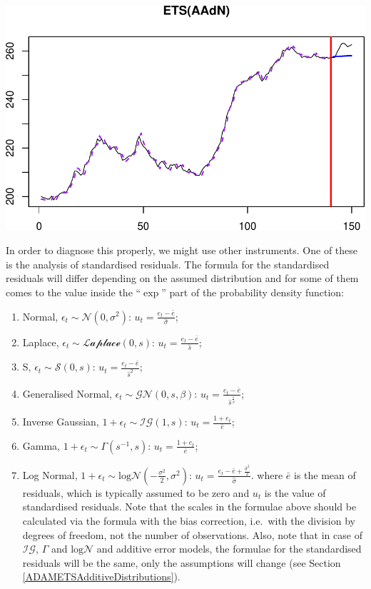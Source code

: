 \documentclass[
]{book}
\providecommand{\tightlist}{%
  \setlength{\itemsep}{0pt}\setlength{\parskip}{0pt}}
\theoremstyle{definition}
\theoremstyle{definition}
\theoremstyle{definition}
\theoremstyle{definition}
\theoremstyle{remark}
\begin{document}
\includegraphics{adam_files/figure-latex/unnamed-chunk-137-1.pdf}

In order to diagnose this properly, we might use other instruments. One of these is the analysis of standardised residuals. The formula for the standardised residuals will differ depending on the assumed distribution and for some of them comes to the value inside the ``\(\exp\)'' part of the probability density function:

\begin{enumerate}
\def\labelenumi{\arabic{enumi}.}
\tightlist
\item
  Normal, \(\epsilon_t \sim \mathcal{N}(0, \sigma^2)\): \(u_t = \frac{e_t - \bar{e}}{\hat{\sigma}}\);
\item
  Laplace, \(\epsilon_t \sim \mathcal{Laplace}(0, s)\): \(u_t = \frac{e_t - \bar{e}}{\hat{s}}\);
\item
  S, \(\epsilon_t \sim \mathcal{S}(0, s)\): \(u_t = \frac{e_t - \bar{e}}{\hat{s}^2}\);
\item
  Generalised Normal, \(\epsilon_t \sim \mathcal{GN}(0, s, \beta)\): \(u_t = \frac{e_t - \bar{e}}{\hat{s}^{\frac{1}{\beta}}}\);
\item
  Inverse Gaussian, \(1+\epsilon_t \sim \mathcal{IG}(1, s)\): \(u_t = \frac{1+e_t}{\bar{e}}\);
\item
  Gamma, \(1+\epsilon_t \sim \mathcal{\Gamma}(s^{-1}, s)\): \(u_t = \frac{1+e_t}{\bar{e}}\);
\item
  Log Normal, \(1+\epsilon_t \sim \mathrm{log}\mathcal{N}\left(-\frac{\sigma^2}{2}, \sigma^2\right)\): \(u_t = \frac{e_t - \bar{e} +\frac{\hat{\sigma}^2}{2}}{\hat{\sigma}}\).
  where \(\bar{e}\) is the mean of residuals, which is typically assumed to be zero and \(u_t\) is the value of standardised residuals. Note that the scales in the formulae above should be calculated via the formula with the bias correction, i.e.~with the division by degrees of freedom, not the number of observations. Also, note that in case of \(\mathcal{IG}\), \(\Gamma\) and \(\mathrm{log}\mathcal{N}\) and additive error models, the formulae for the standardised residuals will be the same, only the assumptions will change (see Section \ref{ADAMETSAdditiveDistributions}).
\end{enumerate}
\end{document}
